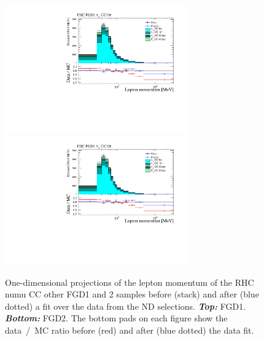 \begin{figure}[ht]
  \center
  \includegraphics[keepaspectratio=true,width=0.7\textwidth,page=15]{images/BANFF/reactionCodeStacks_PrefitAndPostfit_mom.pdf}\\
  \includegraphics[keepaspectratio=true,width=0.7\textwidth,page=18]{images/BANFF/reactionCodeStacks_PrefitAndPostfit_mom.pdf}\\
  \begin{center}
    \caption[RHC $\nu_\mu$ CC other FGD1 and 2 samples before and
    after a fit over the data from the ND280
    selections]{One-dimensional projections of the lepton momentum of
      the \Gls{RHC} \Gls{numu} \Gls{CC} other \Gls{FGD}1 and 2 samples
      before (stack) and after (blue dotted) a fit over the data from
      the \Gls{ND} selections. \textbf{\textit{Top:}}
      \Gls{FGD}1. \textbf{\textit{Bottom:}} \Gls{FGD}2. The bottom
      pads on each figure show the data~/~\Gls{MC} ratio before (red)
      and after (blue dotted) the data fit.}
    \label{fig:numubkgCCOth}
  \end{center}
\end{figure}


